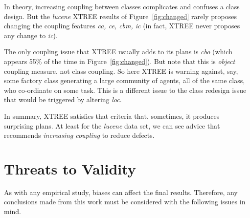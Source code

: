 \documentclass{sig-alternate}
\newcommand{\fig}[1]{Figure~\ref{fig:#1}}
\begin{document}
In theory, increasing coupling between classes complicates and confuses a class design.
But the {\em lucene} XTREE results  of  \fig{changed} rarely proposes changing   the
coupling features {\em ca, ce, cbm, ic} (in fact, XTREE never proposes any change to {\em ic}).

The only coupling issue that XTREE   usually adds to its plans is {\em cbo} (which appears 55\% of the time
in \fig{changed}). But note  that this is {\em object} coupling measure, not class coupling. So here
XTREE is warning against, say, some factory class generating a large
community of agents, all of the same class, who
co-ordinate on some task. This is a different issue to the class redesign issue that would
be triggered by altering {\em loc}.

In summary, XTREE satisfies that criteria that, sometimes, it produces surprising plans.
At least for the {\em lucene} data set, we can see advice that recommends {\em increasing coupling}
to reduce defects.

 


 
\section{Threats to Validity}\label{sect:valid}


As with any empirical study, biases can affect the final results. Therefore, any
conclusions made from this work must be considered with the following issues in
mind.

 
\end{document}
